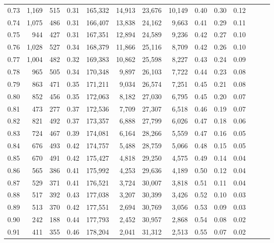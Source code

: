 \begin{tabular}{rrrrrrrrrrrrrr}
0.73 &  1,169 &  515 &  0.31 &  165,332 &   14,913 &  23,676 &  10,149 &  0.40 &  0.30 &      0.12 \\
0.74 &  1,075 &  486 &  0.31 &  166,407 &   13,838 &  24,162 &   9,663 &  0.41 &  0.29 &      0.11 \\
0.75 &    944 &  427 &  0.31 &  167,351 &   12,894 &  24,589 &   9,236 &  0.42 &  0.27 &      0.10 \\
0.76 &  1,028 &  527 &  0.34 &  168,379 &   11,866 &  25,116 &   8,709 &  0.42 &  0.26 &      0.10 \\
0.77 &  1,004 &  482 &  0.32 &  169,383 &   10,862 &  25,598 &   8,227 &  0.43 &  0.24 &      0.09 \\
0.78 &    965 &  505 &  0.34 &  170,348 &    9,897 &  26,103 &   7,722 &  0.44 &  0.23 &      0.08 \\
0.79 &    863 &  471 &  0.35 &  171,211 &    9,034 &  26,574 &   7,251 &  0.45 &  0.21 &      0.08 \\
0.80 &    852 &  456 &  0.35 &  172,063 &    8,182 &  27,030 &   6,795 &  0.45 &  0.20 &      0.07 \\
0.81 &    473 &  277 &  0.37 &  172,536 &    7,709 &  27,307 &   6,518 &  0.46 &  0.19 &      0.07 \\
0.82 &    821 &  492 &  0.37 &  173,357 &    6,888 &  27,799 &   6,026 &  0.47 &  0.18 &      0.06 \\
0.83 &    724 &  467 &  0.39 &  174,081 &    6,164 &  28,266 &   5,559 &  0.47 &  0.16 &      0.05 \\
0.84 &    676 &  493 &  0.42 &  174,757 &    5,488 &  28,759 &   5,066 &  0.48 &  0.15 &      0.05 \\
0.85 &    670 &  491 &  0.42 &  175,427 &    4,818 &  29,250 &   4,575 &  0.49 &  0.14 &      0.04 \\
0.86 &    565 &  386 &  0.41 &  175,992 &    4,253 &  29,636 &   4,189 &  0.50 &  0.12 &      0.04 \\
0.87 &    529 &  371 &  0.41 &  176,521 &    3,724 &  30,007 &   3,818 &  0.51 &  0.11 &      0.04 \\
0.88 &    517 &  392 &  0.43 &  177,038 &    3,207 &  30,399 &   3,426 &  0.52 &  0.10 &      0.03 \\
0.89 &    513 &  370 &  0.42 &  177,551 &    2,694 &  30,769 &   3,056 &  0.53 &  0.09 &      0.03 \\
0.90 &    242 &  188 &  0.44 &  177,793 &    2,452 &  30,957 &   2,868 &  0.54 &  0.08 &      0.02 \\
0.91 &    411 &  355 &  0.46 &  178,204 &    2,041 &  31,312 &   2,513 &  0.55 &  0.07 &      0.02 \\

\end{tabular}
